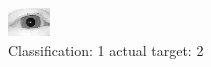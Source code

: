 \begin{figure}[h!]
\begin{center}
\includegraphics[width=0.60\columnwidth]{figures/ID3066_class_1_target_2.png}
\end{center}
\caption{ Classification: 1 actual target: 2}
\label{fig:ID3066_class_1_target_2}
\end{figure}
